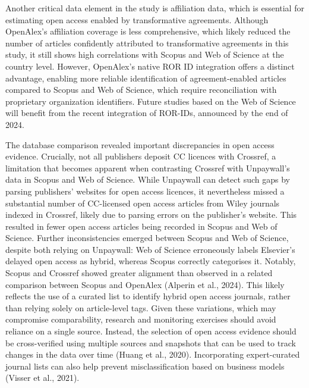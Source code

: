 \documentclass[a4paper,man,floatsintext,longtable,noextraspace,10pt]{apa6}
\begin{document}
Another critical data element in the study is affiliation data, which is
essential for estimating open access enabled by transformative
agreements. Although OpenAlex's affiliation coverage is less
comprehensive, which likely reduced the number of articles confidently
attributed to transformative agreements in this study, it still shows
high correlations with Scopus and Web of Science at the country level.
However, OpenAlex's native ROR ID integration offers a distinct
advantage, enabling more reliable identification of agreement-enabled
articles compared to Scopus and Web of Science, which require
reconciliation with proprietary organization identifiers. Future studies
based on the Web of Science will benefit from the recent integration of
ROR-IDs, announced by the end of 2024.

The database comparison revealed important discrepancies in open access
evidence. Crucially, not all publishers deposit CC licences with
Crossref, a limitation that becomes apparent when contrasting Crossref
with Unpaywall's data in Scopus and Web of Science. While Unpaywall can
detect such gaps by parsing publishers' websites for open access
licences, it nevertheless missed a substantial number of CC-licensed
open access articles from Wiley journals indexed in Crossref, likely due
to parsing errors on the publisher's website. This resulted in fewer
open access articles being recorded in Scopus and Web of Science.
Further inconsistencies emerged between Scopus and Web of Science,
despite both relying on Unpaywall: Web of Science erroneously labels
Elsevier's delayed open access as hybrid, whereas Scopus correctly
categorises it. Notably, Scopus and Crossref showed greater alignment
than observed in a related comparison between Scopus and OpenAlex
(Alperin et al., 2024). This likely reflects the use of a curated list
to identify hybrid open access journals, rather than relying solely on
article-level tags. Given these variations, which may compromise
comparability, research and monitoring exercises should avoid reliance
on a single source. Instead, the selection of open access evidence
should be cross-verified using multiple sources and snapshots that can
be used to track changes in the data over time (Huang et al., 2020).
Incorporating expert-curated journal lists can also help prevent
misclassification based on business models (Visser et al., 2021).
\end{document}
